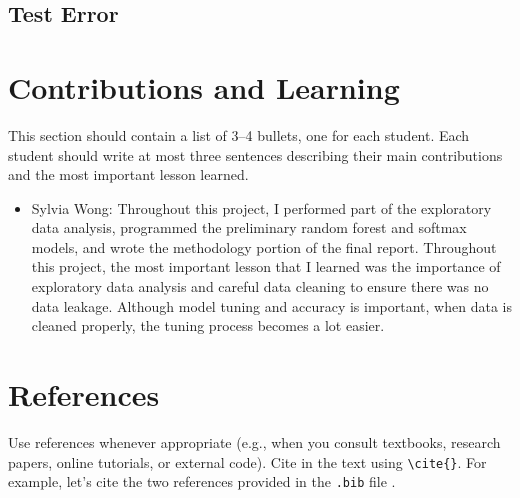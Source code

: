 \documentclass[12pt]{article}
\begin{document}
\subsection*{Test Error}


\section{Contributions and Learning}



This section should contain a list of 3–4 bullets, one for each student. Each
student should write at most three sentences describing their main contributions
and the most important lesson learned.

\begin{itemize}
    \item Sylvia Wong: Throughout this project, I performed part of the exploratory data analysis, programmed the preliminary random forest and softmax models, and wrote the methodology portion of the final report. Throughout this project, the most important lesson that I learned was the importance of exploratory data analysis and careful data cleaning to ensure there was no data leakage. Although model tuning and accuracy is important, when data is cleaned properly, the tuning process becomes a lot easier.
\end{itemize}



\section{References}
Use references whenever appropriate (e.g., when you consult textbooks, research
papers, online tutorials, or external code). Cite in the text using \verb|\cite{}|.
For example, let's cite the two references provided in the \texttt{.bib} file
\cite{bishop2006prml,hastie2009esl}.


\end{document}
